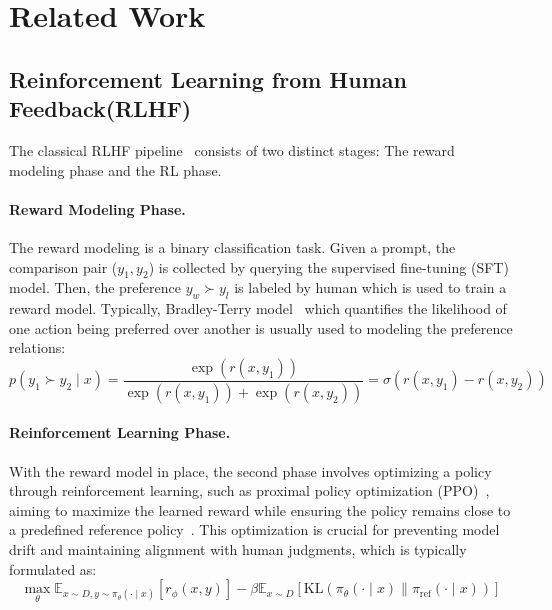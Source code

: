 \section{Related Work}
\subsection{Reinforcement Learning from Human Feedback(RLHF)}

The classical RLHF pipeline~\citep{Christiano2017Deep,Ziegler2019Fine,Ouyang2022TrainingLM} consists of two distinct stages: The reward modeling phase and the RL phase.

\vspace{-0.25cm}
\paragraph{Reward Modeling Phase.}The reward modeling is a binary classification task. Given a prompt, the comparison pair ($y_1, y_2$) is collected by querying the supervised fine-tuning (SFT) model. Then, the preference $y_w \succ y_l$ is labeled by human which is used to train a reward model. Typically, Bradley-Terry model~\citep{Bradley1952RankAO} which quantifies the likelihood of one action being preferred over another is usually used to modeling the preference relations:
\begin{equation}
    p\left(y_1 \succ y_2 \mid x\right)=\frac{\exp \left(r\left(x, y_1\right)\right)}{\exp \left(r\left(x, y_1\right)\right)+\exp \left(r\left(x, y_2\right)\right)}=\sigma\left(r\left(x, y_1\right)-r\left(x, y_2\right)\right)
\end{equation}

\vspace{-0.25cm}
\paragraph{Reinforcement Learning Phase.} With the reward model in place, the second phase involves optimizing a policy through reinforcement learning, such as proximal policy optimization (PPO)~\citep{Schulman2017Proximal}, aiming to maximize the learned reward while ensuring the policy remains close to a predefined reference policy~\citep{Korbak2022RLWK}. This optimization is crucial for preventing model drift and maintaining alignment with human judgments, which is typically formulated as:
\begin{equation}
    \max _\theta \mathbb{E}_{x \sim D, y \sim \pi_\theta(\cdot \mid x)}\left[r_\phi(x, y)\right]-\beta \mathbb{E}_{x \sim D}\left[\mathrm{KL}\left(\pi_\theta(\cdot \mid x) \| \pi_{\operatorname{ref}}(\cdot \mid x)\right)\right]
\end{equation}

